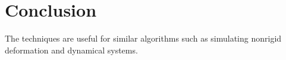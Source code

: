 \documentclass[10pt,conference]{IEEEtran}
\begin{document}
%






\section{Conclusion}
The techniques are
useful for similar algorithms such as simulating nonrigid deformation and
dynamical systems.






\end{document}

